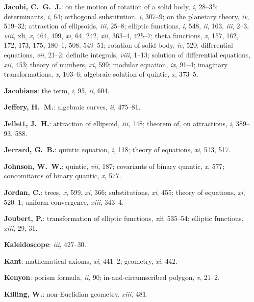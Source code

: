 \documentclass[11pt,a4paper]{article}
\newcommand{\IndexEntry}[1]{\textbf{#1}}
\newcommand{\V}[1]{\textit{#1}} %
\begin{document}
\IndexEntry{Jacobi, C.\ G.\ J.}: on the motion of rotation of a solid body, \V{i}, 28--35; determinants, \V{i}, 64; orthogonal substitution, \V{i}, 307--9; on the planetary theory, \V{iv}, 519--32; attraction of ellipsoids, \V{iii}, 25--8; elliptic functions, \V{i}, 548, \V{ii}, 163, \V{iii}, 2--3, \V{viii}, xli, \V{x}, 464, 499, \V{xi}, 64, 242, \V{xii}, 363--4, 425--7; theta functions, \V{x}, 157, 162, 172, 173, 175, 180--1, 508, 549--51; rotation of solid body, \V{iv}, 520; differential equations, \V{vii}, 21--2; definite integrals, \V{viii}, 1--13; solution of differential equations, \V{xii}, 453; theory of numbers, \V{xi}, 599; modular equation, \V{ix}, 91--4; imaginary transformations, \V{x}, 103--6; algebraic solution of quintic, \V{x}, 373--5.

\IndexEntry{Jacobians}: the term, \V{i}, 95, \V{ii}, 604.

\IndexEntry{Jeffery, H.\ M.}: algebraic curves, \V{ii}, 475--81.

\IndexEntry{Jellett, J.\ H.}: attraction of ellipsoid, \V{iii}, 148; theorem of, on attractions, \V{i}, 389--93, 588.

\IndexEntry{Jerrard, G.\ B.}: quintic equation, \V{i}, 118; theory of equations, \V{xi}, 513, 517.

\IndexEntry{Johnson, W.\ W.}: quintic, \V{vii}, 187; covariants of binary quantic, \V{x}, 577; concomitants of binary quantic, \V{x}, 577.

\IndexEntry{Jordan, C.}: trees, \V{x}, 599, \V{xi}, 366; substitutions, \V{xi}, 455; theory of equations, \V{xi}, 520--1; uniform convergence, \V{xiii}, 343--4.

\IndexEntry{Joubert, P.}: transformation of elliptic functions, \V{xii}, 535--54; elliptic functions, \V{xiii}, 29, 31.

\newpage

\setcounter{page}{107}

\IndexEntry{Kaleidoscope}: \V{iii}, 427--30.

\IndexEntry{Kant}: mathematical axioms, \V{xi}, 441--2; geometry, \V{xi}, 442.

\IndexEntry{Kenyon}: porism formula, \V{ii}, 90; in-and-circumscribed polygon, \V{v}, 21--2.

\IndexEntry{Killing, W.}: non-Euclidian geometry, \V{xiii}, 481.
\end{document}

